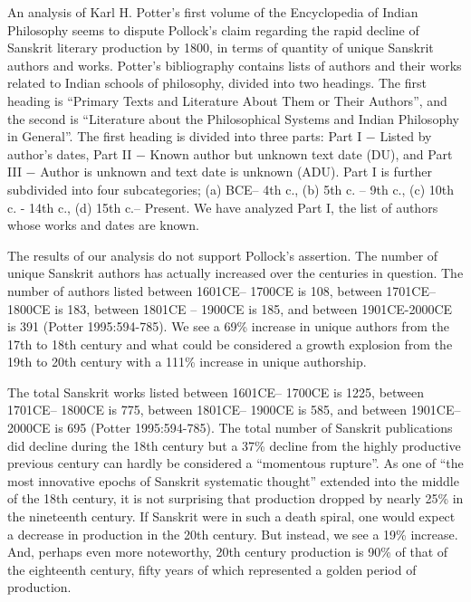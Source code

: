 An analysis of Karl H. Potter’s first volume of the Encyclopedia of Indian Philosophy seems to dispute Pollock’s claim regarding the rapid decline of Sanskrit literary production by 1800, in terms of quantity of unique Sanskrit authors and works. Potter’s bibliography contains lists of authors and their works related to Indian schools of philosophy, divided into two headings. The first heading is “Primary Texts and Literature About Them or Their Authors”, and the second is “Literature about the Philosophical Systems and Indian Philosophy in General”. The first heading is divided into three parts: Part I − Listed by author’s dates, Part II − Known author but unknown text date (DU), and Part III − Author is unknown and text date is unknown (ADU). Part I is further subdivided into four subcategories; (a) BCE– 4th c., (b) 5th c. – 9th c., (c) 10th c. - 14th c., (d) 15th c.– Present. We have analyzed Part I, the list of authors whose works and dates are known. 

The results of our analysis do not support Pollock’s assertion. The number of unique Sanskrit authors has actually increased over the centuries in question. The number of authors listed between 1601CE– 1700CE is 108, between 1701CE– 1800CE is 183, between 1801CE – 1900CE is 185, and between 1901CE-2000CE is 391 (Potter 1995:594-785). We see a 69\% increase in unique authors from the 17th to 18th century and what could be considered a growth explosion from the 19th to 20th century with a 111\% increase in unique authorship. 

The total Sanskrit works listed between 1601CE– 1700CE is 1225, between 1701CE– 1800CE is 775, between 1801CE– 1900CE is 585, and between 1901CE– 2000CE is 695 (Potter 1995:594-785). The total number of Sanskrit publications did decline during the 18th century but a 37\% decline from the highly productive previous century can hardly be considered a “momentous rupture”. As one of “the most innovative epochs of Sanskrit systematic thought” extended into the middle of the 18th century, it is not surprising that production dropped by nearly 25\% in the nineteenth century. If Sanskrit were in such a death spiral, one would expect a decrease in production in the 20th century. But instead, we see a 19\% increase. And, perhaps even more noteworthy, 20th century production is 90\% of that of the eighteenth century, fifty years of which represented a golden period of production. 

